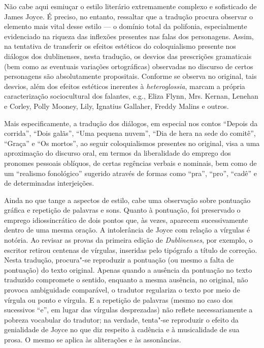 {Não cabe aqui esmiuçar o estilo literário extremamente complexo e sofisticado de
James Joyce. É preciso, no entanto, ressaltar que a tradução procura observar o
elemento mais vital desse estilo --- o domínio total da polifonia, especialmente
evidenciado na riqueza das inflexões presentes nas falas dos personagens.
Assim, na tentativa de transferir os efeitos estéticos do coloquialismo
presente nos diálogos dos dublinenses, nesta tradução, os desvios das
prescrições gramaticais (bem como as eventuais variações ortográficas)
observadas no discurso de certos personagens são absolutamente propositais.
Conforme se observa no original, tais desvios, além dos efeitos estéticos
inerentes à \textit{heteroglossia}, marcam a própria caracterização
sociocultural dos falantes, e.g., Eliza Flynn, Mrs. Kernan, Lenehan e Corley,
Polly Mooney, Lily, Ignatius Gallaher, Freddy Malins e outros.

Mais especificamente, a tradução dos diálogos, em especial nos contos “Depois da
corrida”, “Dois galãs”, “Uma pequena nuvem”, “Dia de hera na sede do comitê”,
“Graça” e “Os mortos”, ao seguir coloquialismos presentes no original, visa a
uma aproximação do discurso oral, em termos da liberalidade do emprego dos
pronomes pessoais oblíquos, de certas regências verbais e nominais, bem como de
um “realismo fonológico” sugerido através de formas como “pra”, “pro”, “cadê” e
de determinadas interjeições.

Ainda no que tange a aspectos de estilo, cabe uma observação sobre pontuação
gráfica e repetição de palavras e sons. Quanto à pontuação, foi preservado o
emprego idiossincrático de dois pontos que, às vezes, aparecem sucessivamente
dentro de uma mesma oração. A intolerância de Joyce com relação a vírgulas é
notória. Ao revisar as provas da primeira edição de \textit{Dublinenses}, por
exemplo, o escritor retirou centenas de vírgulas, inseridas pelo tipógrafo a
título de correção. Nesta tradução, procura"-se reproduzir a pontuação (ou mesmo
a falta de pontuação) do texto original. Apenas quando a ausência da pontuação
no texto traduzido compromete o sentido, enquanto a mesma ausência, no
original, não provoca ambiguidade comparável, o tradutor regulariza o texto por
meio de vírgula ou ponto e vírgula.  E a repetição de palavras (mesmo no caso
dos sucessivos “e”, em lugar das vírgulas desprezadas) não reflete
necessariamente a pobreza vocabular do tradutor; na verdade, tenta"-se
reproduzir o efeito da genialidade de Joyce no que diz respeito à cadência e à
musicalidade de sua prosa. O mesmo se aplica às aliterações e às assonâncias.

}

